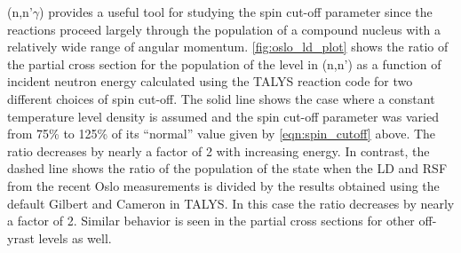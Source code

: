 \documentclass[letterpaper]{ar-1col}
\begin{document}
(n,n'$\gamma$) provides a useful tool for studying the spin cut-off parameter since the reactions proceed largely through the population of a compound nucleus with a relatively wide range of angular momentum. \autoref{fig:oslo_ld_plot} shows the ratio of the partial cross section for the population of the  level in (n,n') as a function of incident neutron energy calculated using the TALYS reaction code for two different choices of spin cut-off.  The solid line shows the case where a constant temperature level density is assumed and the spin cut-off parameter was varied from 75\% to 125\% of its \enquote{normal} value given by \autoref{eqn:spin_cutoff} above.  The ratio decreases by nearly a factor of 2 with increasing energy.  In contrast, the dashed line shows the ratio of the  population of the  state when the LD and RSF from the recent Oslo measurements \cite{Gut13a} is divided by the results obtained using the default Gilbert and Cameron in TALYS.  In this case the ratio decreases by nearly a factor of 2.  Similar behavior is seen in the partial cross sections for other off-yrast levels as well. 
\end{document}
